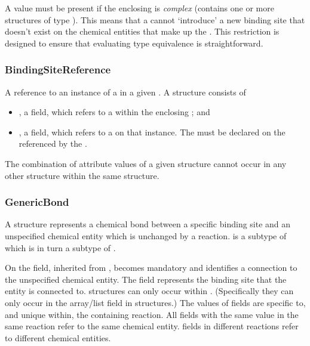 \documentclass{cekarticle}
\begin{document}
A  value must be present if the
enclosing  is \emph{complex} (contains one or
more structures of type ).  This means
that a  cannot `introduce' a new binding site
that doesn't exist on the chemical entities that make up the
.  This restriction is designed to ensure that
evaluating type equivalence is straightforward.

\subsubsection{BindingSiteReference}

A reference to an instance of a  in a given .
A  structure consists of

\begin{itemize}

\item {}, a  field,
which refers to a  within the enclosing
; and

\item {}, a  field, which refers to a
 on that instance.  The 
must be declared on the  referenced by the
.

\end{itemize}

The combination of attribute values of a given  structure cannot
occur in any other  structure within the same 
structure.

\subsubsection{GenericBond}

A  structure represents a chemical bond between
a specific binding site and an unspecified chemical entity which
is unchanged by a reaction.  is a subtype of
 which is in turn a subtype of .

On  the  field, inherited from
, becomes mandatory and identifies a connection to
the unspecified chemical entity. The 
field represents the binding site that the entity is connected to.
 structures can only occur within
. (Specifically they can only occur in the
 array/list field in 
structures.) The values of   fields
are specific to, and unique within, the containing reaction. All
  fields with the same value in the
same reaction refer to the same chemical entity.
  fields in different reactions
refer to different chemical entities.
\end{document}

